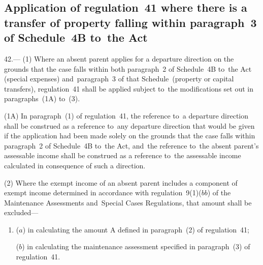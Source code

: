 \documentclass[12pt,a4paper]{article}
\begin{document}
\subsection[42. Application of regulation~41 where there is a transfer of property falling
within paragraph~3 of Schedule~4B to~the Act]{Application of regulation~41 where there is a transfer of property falling
within paragraph~3 of Schedule~4B to~the Act}

42.—%
%
(1) Where an absent parent applies for a departure direction on the grounds that the case falls within both paragraph~2 of Schedule~4B to~the Act (special expenses) and~paragraph~3 of that Schedule~(property or capital transfers), regulation~41 shall be applied subject to~the modifications set out in paragraphs~(1A) to~(3).

(1A) In paragraph~(1) of regulation~41, the reference to~a departure direction shall be construed as a reference to~any departure direction that would be given if the application had been made solely on the grounds that the case falls within paragraph~2 of Schedule~4B to~the Act, and~the reference to~the absent parent’s assessable income shall be construed as a reference to~the assessable income calculated in consequence of such a direction.

(2) Where the exempt income of an absent parent includes a component of exempt
income determined in accordance with regulation~9(1)($bb$) of the Maintenance
Assessments and~Special Cases Regulations, that amount shall be excluded—
\begin{enumerate}\item[]
($a$) in calculating the amount A defined in paragraph~(2) of regulation~41;

($b$) in calculating the maintenance assessment specified in paragraph~(3) of
regulation~41.
\end{enumerate}

\end{document}
